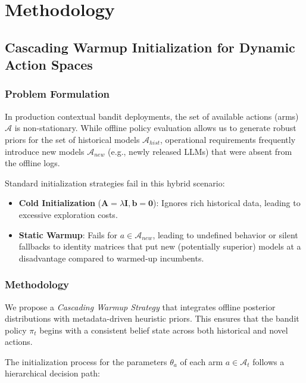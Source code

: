 
\section{Methodology}

\subsection{Cascading Warmup Initialization for Dynamic Action Spaces}
\label{sec:cascading_warmup}

\subsubsection{Problem Formulation}
In production contextual bandit deployments, the set of available actions (arms) $\mathcal{A}$ is non-stationary. While offline policy evaluation allows us to generate robust priors for the set of historical models $\mathcal{A}_{hist}$, operational requirements frequently introduce new models $\mathcal{A}_{new}$ (e.g., newly released LLMs) that were absent from the offline logs.

Standard initialization strategies fail in this hybrid scenario:
\begin{itemize}
    \item \textbf{Cold Initialization} ($\mathbf{A}=\lambda \mathbf{I}, \mathbf{b}=\mathbf{0}$): Ignores rich historical data, leading to excessive exploration costs.
    \item \textbf{Static Warmup}: Fails for $a \in \mathcal{A}_{new}$, leading to undefined behavior or silent fallbacks to identity matrices that put new (potentially superior) models at a disadvantage compared to warmed-up incumbents.
\end{itemize}

\subsubsection{Methodology}
We propose a \textit{Cascading Warmup Strategy} that integrates offline posterior distributions with metadata-driven heuristic priors. This ensures that the bandit policy $\pi_t$ begins with a consistent belief state across both historical and novel actions.

The initialization process for the parameters $\theta_a$ of each arm $a \in \mathcal{A}_{t}$ follows a hierarchical decision path:

